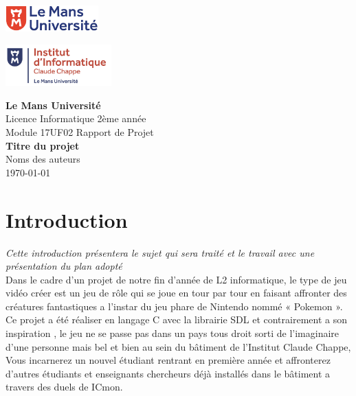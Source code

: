\documentclass[12pt,a4paper, twoside]{article}
\begin{document}
\begin{titlepage}
    \begin{minipage}[t]{0.48\textwidth}
        \includegraphics[height=1.01cm]{logolemansU.png}
    \end{minipage}
    \hfill
    \begin{minipage}[t]{0.25\textwidth}
        \includegraphics[height=1.6cm]{logo_IC2.png}
    \end{minipage}
    
    \vspace{2cm}
    \begin{center}
        \Large\textbf{Le Mans Université}\\
        \vspace{0.5cm}
        Licence Informatique 2ème année\\
        Module 17UF02 Rapport de Projet\\
        \vspace{0.5cm}
        \Large\textbf{Titre du projet}\\
        \vspace{1cm}
        {\large Noms des auteurs}\\
        \vspace{0.5cm}
        {\normalsize \today} 
    \end{center}
\end{titlepage}

\newpage
\tableofcontents
\newpage
{}
\section{Introduction}

\emph{Cette introduction présentera le sujet qui sera traité et le travail avec une présentation du plan adopté}\\
Dans le cadre d'un projet de notre fin d'année de L2 informatique, le type de jeu vidéo créer est un jeu de rôle qui se joue en tour par tour en faisant affronter des créatures fantastiques a l’instar du jeu phare de Nintendo nommé « Pokemon ».\\
Ce projet a été réaliser en langage C avec la librairie SDL et contrairement a son inspiration , le jeu ne se passe pas dans un pays tous droit sorti de l’imaginaire d’une personne mais bel et bien au sein du bâtiment de l’Institut Claude Chappe, Vous incarnerez un nouvel étudiant rentrant en première année et affronterez d'autres étudiants et enseignants chercheurs déjà installés dans le bâtiment a travers des duels de ICmon.\\ 
\end{document}

